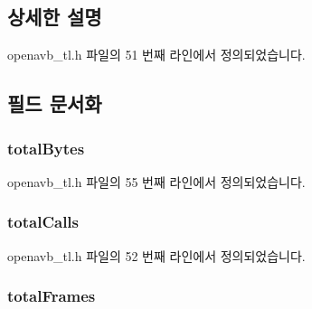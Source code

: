 \subsection{상세한 설명}


openavb\+\_\+tl.\+h 파일의 51 번째 라인에서 정의되었습니다.



\subsection{필드 문서화}
\subsubsection[{\texorpdfstring{total\+Bytes}{totalBytes}}]{ total\+Bytes}\hypertarget{structtalker__stats__t_a0c6a9cfc47f701f45a826b03f96f8169}{}\label{structtalker__stats__t_a0c6a9cfc47f701f45a826b03f96f8169}


openavb\+\_\+tl.\+h 파일의 55 번째 라인에서 정의되었습니다.

\subsubsection[{\texorpdfstring{total\+Calls}{totalCalls}}]{ total\+Calls}\hypertarget{structtalker__stats__t_a9e027d04ac91998fac3dbdfe70e93c8f}{}\label{structtalker__stats__t_a9e027d04ac91998fac3dbdfe70e93c8f}


openavb\+\_\+tl.\+h 파일의 52 번째 라인에서 정의되었습니다.

\subsubsection[{\texorpdfstring{total\+Frames}{totalFrames}}]{ total\+Frames}\hypertarget{structtalker__stats__t_a91aa71fc6996d4038afd5252772b8c16}{}\label{structtalker__stats__t_a91aa71fc6996d4038afd5252772b8c16}


